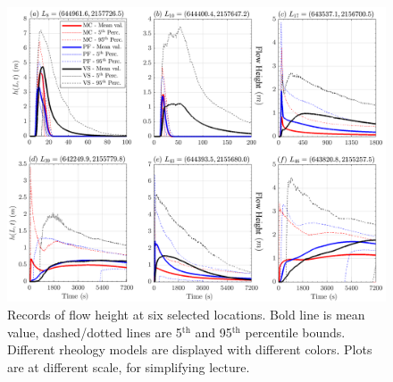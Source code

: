 \documentclass{article}
\begin{document}
\begin{figure}[H]
         \centering
        \includegraphics[width=1\textwidth]{BAF_VolcanDeColima/LocalMeasurments/Height.png}
        \caption{Records of flow height at six selected locations. Bold line is mean value, dashed/dotted lines are 5$^{\mathrm{th}}$ and 95$^{\mathrm{th}}$ percentile bounds. Different rheology models are displayed with different colors. Plots are at different scale, for simplifying lecture.}
        \label{fig:Colima-H}
\end{figure}
\end{document}
